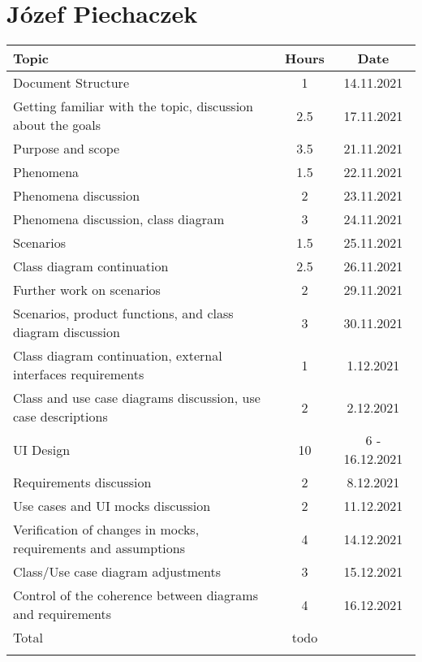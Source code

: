\section*{Józef Piechaczek}
\begin{table}[H]
    \centering
    \begin{tabular}{lcc} \Xhline{1.5pt}
        Topic &  Hours & Date \\ \hline
        Document Structure & 1 & 14.11.2021 \\ 
        Getting familiar with the topic, discussion about the goals & 2.5 & 17.11.2021 \\ 
        Purpose and scope & 3.5 & 21.11.2021 \\ 
        Phenomena & 1.5 & 22.11.2021 \\ 
        Phenomena discussion & 2 & 23.11.2021 \\
        Phenomena discussion, class diagram & 3 & 24.11.2021 \\ 
        Scenarios & 1.5 & 25.11.2021 \\
        Class diagram continuation & 2.5 & 26.11.2021 \\ 
        Further work on scenarios & 2 & 29.11.2021 \\
        Scenarios, product functions, and class diagram discussion & 3 & 30.11.2021\\ 
        Class diagram continuation, external interfaces requirements & 1 & 1.12.2021\\
        Class and use case diagrams discussion, use case descriptions & 2 & 2.12.2021\\
        UI Design & 10 & 6 - 16.12.2021\\ 
        Requirements discussion & 2 & 8.12.2021\\
        Use cases and UI mocks discussion & 2 & 11.12.2021\\
        Verification of changes in mocks, requirements and assumptions & 4 & 14.12.2021\\
        Class/Use case diagram adjustments & 3 & 15.12.2021\\
        Control of the coherence between diagrams and requirements & 4 & 16.12.2021\\
        \hline
        Total &  todo & \\ \Xhline{1.5pt}
    \end{tabular}
\end{table}

